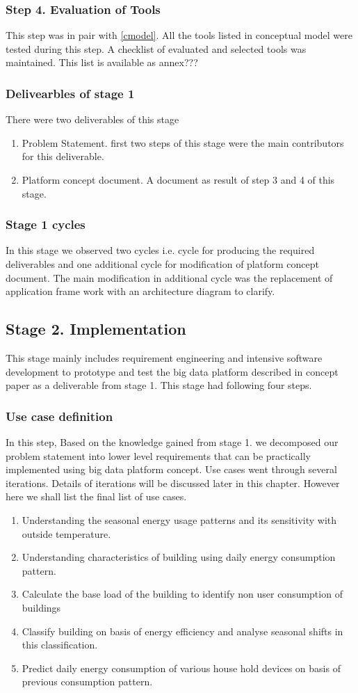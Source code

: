 \subsubsection{Step 4. Evaluation of Tools}
This step was in pair with \ref{cmodel}. All the tools listed in conceptual model were tested during this step. A checklist of evaluated and selected tools was maintained. This list is available as annex???

\subsubsection{Delivearbles of stage 1}
There were two deliverables of this stage
\begin{enumerate}
\item Problem Statement. first two steps of this stage were the main contributors for this deliverable.
\item Platform concept document. A document as result of step 3 and 4 of this stage. 
\end{enumerate}

\subsubsection{Stage 1 cycles}
In this stage we observed two cycles i.e. cycle for producing the required deliverables and one additional cycle for modification of platform concept document. The main modification in additional cycle was the replacement of application frame work with an architecture diagram to clarify.
\subsection{Stage 2. Implementation}
This stage mainly includes requirement engineering and intensive software development to prototype and test the big data platform described in concept paper as a deliverable from stage 1. This stage had following four steps.
\subsubsection{Use case definition} 
In this step, Based on the knowledge gained from stage 1. we decomposed our problem statement into lower level requirements that can be practically implemented using big data platform concept. Use cases went through several iterations. Details of iterations will be discussed later in this chapter. However here we shall list the final list of use cases.
\begin{enumerate}
\item Understanding the seasonal energy usage patterns and its sensitivity with outside temperature.
\item Understanding characteristics of building using daily energy consumption pattern.
\item Calculate the base load of the building to identify non user consumption of buildings
\item Classify building on basis of energy efficiency and analyse seasonal shifts in this classification.
\item Predict daily energy consumption of various house hold devices on basis of previous consumption pattern.
\end{enumerate}
